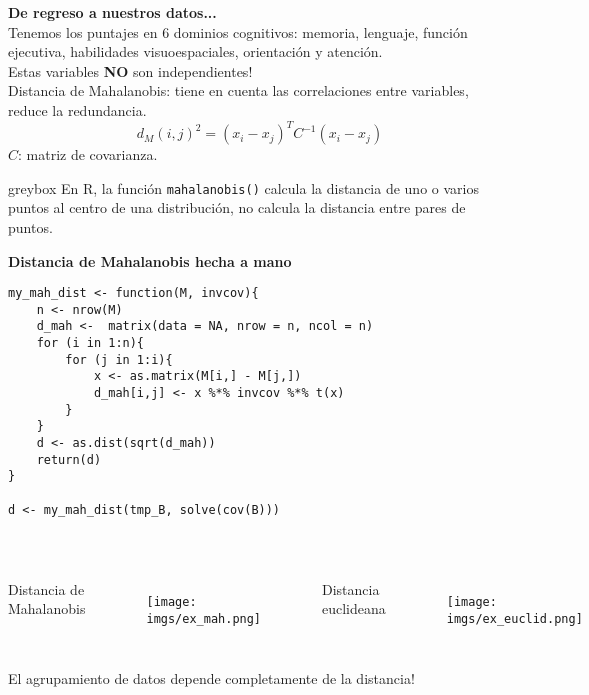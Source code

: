 \documentclass[10pt, aspectratio=169]{beamer}
\begin{document}
\begin{frame}[fragile]{}
\vspace{0.3cm}
\textcolor{HawaianSurf}{\textbf{\large De regreso a nuestros datos...}}\\
\vspace{0.3cm}
Tenemos los puntajes en 6 dominios cognitivos: memoria, lenguaje, función ejecutiva, habilidades visuoespaciales, orientación y atención.\\
\vspace{0.2cm}
\pause
Estas variables \textbf{NO} son independientes!\\
\vspace{0.4cm}
\pause
\textcolor{UltraViolet}{Distancia de Mahalanobis}: tiene en cuenta las correlaciones entre variables, reduce la redundancia.
\[d_M(i,j)^2 = (x_i - x_j)^TC^{-1}(x_i - x_j)\]
$C$: matriz de covarianza.\\
\vspace{0.8cm}
\pause
{}
\begin{beamercolorbox}[sep=2mm]{greybox}
En R, la función \texttt{mahalanobis()} calcula la distancia de uno o varios puntos al centro de una distribución, no calcula la distancia entre pares de puntos.
\end{beamercolorbox}
\end{frame}

\begin{frame}[fragile]{}
\vspace{0.3cm}
\textcolor{UltraViolet}{\textbf{\large Distancia de Mahalanobis hecha a mano}}\\
\vspace{0.3cm}
\begin{verbatim}
my_mah_dist <- function(M, invcov){
    n <- nrow(M)
    d_mah <-  matrix(data = NA, nrow = n, ncol = n)
    for (i in 1:n){
        for (j in 1:i){
            x <- as.matrix(M[i,] - M[j,])
            d_mah[i,j] <- x %*% invcov %*% t(x)
        }
    }
    d <- as.dist(sqrt(d_mah))
    return(d)
}

d <- my_mah_dist(tmp_B, solve(cov(B)))
\end{verbatim}
\end{frame}

{
\begin{frame}[fragile]{}
~\\
\vspace{0.4cm}
\begin{columns}
 \textcolor{UltraViolet}{Distancia de Mahalanobis}
 \begin{figure}
 \texttt{[image: imgs/ex\_mah.png]}
 \end{figure}
 \textcolor{UltraViolet}{Distancia euclideana}
 \begin{figure}
 \texttt{[image: imgs/ex\_euclid.png]}
 \end{figure}
\end{columns}
\pause 
El agrupamiento de datos depende completamente de la distancia!
\end{frame}
}
\end{document}
